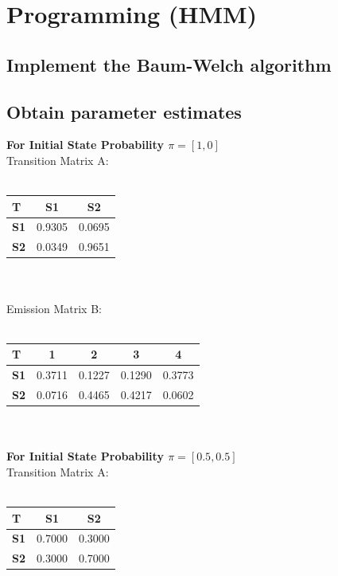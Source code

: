 \documentclass[paper=a4, fontsize=11pt]{scrartcl} %
\numberwithin{equation}{section} %
\numberwithin{figure}{section} %
\numberwithin{table}{section} %
\begin{document}
\newpage
\section{Programming (HMM)}
\subsection{}
\subsection{Implement the Baum-Welch algorithm}
\subsection{Obtain parameter estimates}


\textbf{For Initial State Probability $\pi = [1,0]$}\\

Transition Matrix A:\\\\
\begin{tabular}{l*{2}{c}}
\textbf{T} & \textbf{S1} &  \textbf{S2} \\
\hline
\textbf{S1} & 0.9305  &  0.0695\\
\textbf{S2} & 0.0349  &  0.9651
\end{tabular}\\\\

Emission Matrix B:\\\\
\begin{tabular}{l*{4}{c}}
\textbf{T} & \textbf{1} &  \textbf{2} & \textbf{3} & \textbf{4} \\
\hline
\textbf{S1} & 0.3711  &  0.1227  &  0.1290  &  0.3773\\
\textbf{S2} & 0.0716  &  0.4465  &  0.4217  &  0.0602
\end{tabular}\\\\


\textbf{For Initial State Probability $\pi = [0.5,0.5]$}\\

Transition Matrix A:\\\\
\begin{tabular}{l*{2}{c}}
\textbf{T} & \textbf{S1} &  \textbf{S2} \\
\hline
\textbf{S1} & 0.7000 & 0.3000\\
\textbf{S2} & 0.3000 & 0.7000
\end{tabular}\\\\
\end{document}

